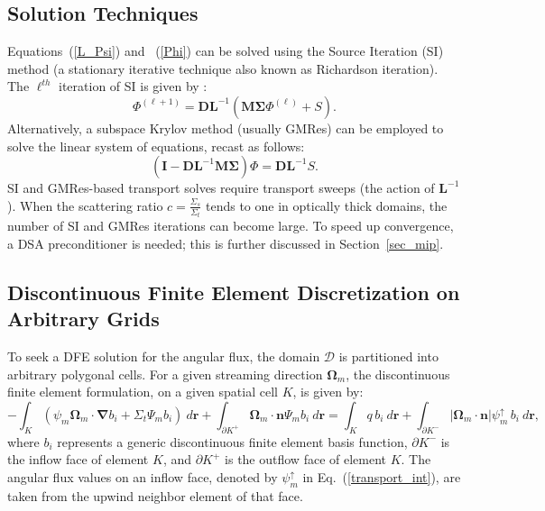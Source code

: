 \documentclass[preprint,10pt]{elsarticle}
\newcommand\grad{\boldsymbol{\nabla}}
\newcommand\bo{\boldsymbol{\Omega}}
\newcommand\br{\mathbf{r}}
\newcommand\bs{\boldsymbol}
\newcommand\mc{\mathcal}
\renewcommand{\(}{\left(}
\renewcommand{\)}{\right)}
\renewcommand{\[}{\left[}
\renewcommand{\]}{\right]}
\newcommand{\tf}{b_i}
\newcommand\vn{\bs{n}}
\begin{document}
\subsection{Solution Techniques}

Equations~\textup {(\ref {L_Psi})} and~ \textup {(\ref {Phi})} can be solved using the Source Iteration (SI) method (a
stationary iterative technique also known as Richardson iteration). 
The $\ell^{th}$ iteration of SI is given by :
%
\begin{equation}
  \Phi^{(\ell+1)} = \bs{DL}^{-1} \(\bs{M\Sigma}\Phi^{(\ell)} + S\).
\end{equation}
%
Alternatively, a subspace Krylov method (usually GMRes) can be employed to
solve the linear system of equations, recast as follows:
%
\begin{equation}
  \(\bs{I} - \bs{DL}^{-1}\bs{M \Sigma}\) \Phi = \bs{DL}^{-1}S .
\end{equation}
%
SI and GMRes-based transport solves require transport sweeps (the action of $\bs{L}^{-1}$).
When the scattering ratio
$c=\frac{\Sigma_s}{\Sigma_t}$ tends to one in optically thick domains, the
number of SI and GMRes iterations can become large. To speed up convergence, a DSA
preconditioner is needed; this is further discussed in Section~\ref {sec_mip}.

\subsection{Discontinuous Finite Element Discretization on Arbitrary Grids}

To seek a DFE solution for the angular flux, the domain $\mc{D}$ is partitioned 
into arbitrary polygonal cells. For 
a given streaming direction $\bo_m$, the discontinuous finite
element formulation, on a given spatial cell $K$, is given by:
%
\begin{equation}
  -\int_{K} \(\psi_m \bo_m \cdot \grad \tf + \Sigma_t \Psi_m \tf \)\ d\br +
  \int_{\partial K^+} \bo_m \cdot \vn \Psi_m \tf \ d\br = \int_{K} q\, \tf \ d\br +
  \int_{\partial K^{-}} |\bo_m \cdot \vn| \psi_m^{\uparrow}\, \tf \ d\br,
  \label{transport_int}
\end{equation}
%
where $\tf$ represents a generic discontinuous finite element basis function, $\partial K^{-}$ 
is the inflow face of element $K$, and $\partial K^{+}$ is the outflow face of 
element $K$. The angular flux values on an inflow face, denoted by 
$\psi_m^{\uparrow}$ in Eq.~\textup {(\ref {transport_int})}, are taken from the upwind neighbor 
element of that face.
\end{document}

